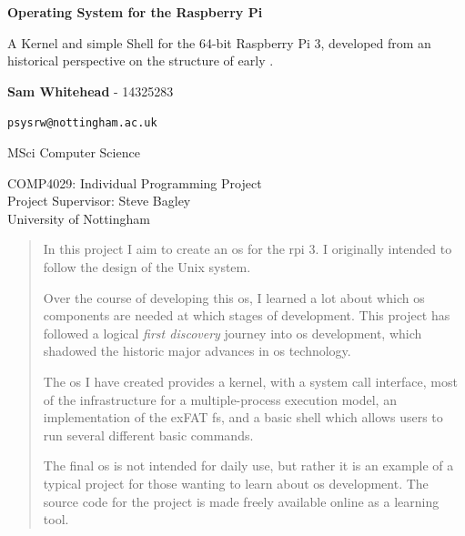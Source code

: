 \documentclass{article}
\begin{document}
\begin{titlepage}
    \begin{center}
        \null\mbox{}\vfill

        \vspace*{1cm}

        \huge
        \textbf{Operating System for the Raspberry Pi}

        \vspace{0.5cm}
        \Large
        A Kernel and simple Shell for the 64-bit Raspberry Pi 3, developed
        from an historical perspective on the structure of early
        .

        \Large

        \vspace{2.5cm}

        \textbf{Sam Whitehead} - 14325283

        \texttt{psysrw@nottingham.ac.uk}

        MSci Computer Science

        \vfill

        COMP4029: Individual Programming Project\\
        Project Supervisor: Steve Bagley\\
        University of Nottingham

        \vfill

        \begin{abstract}
            In this project I aim to create an \gls{os} for the \gls{rpi} 3.
            I originally intended to follow the design of the Unix system.

            Over the course of developing this \gls{os}, I learned a lot about
            which \gls{os} components are needed at which stages of
            development. This project has followed a logical \emph{first
            discovery} journey into \gls{os} development, which shadowed the
            historic major advances in \gls{os} technology.

            The \gls{os} I have created provides a kernel, with a system call
            interface, most of the infrastructure for a multiple-process
            execution model, an implementation of the exFAT \gls{fs}, and a
            basic shell which allows users to run several different basic
            commands.

            The final \gls{os} is not intended for daily use, but rather it is
            an example of a typical project for those wanting to learn about
            \gls{os} development. The source code for the project is made
            freely available online as a learning tool.
        \end{abstract}

        \vfill\null
    \end{center}
    \thispagestyle{empty}
\end{titlepage}
\addtocounter{page}{1}
\end{document}

